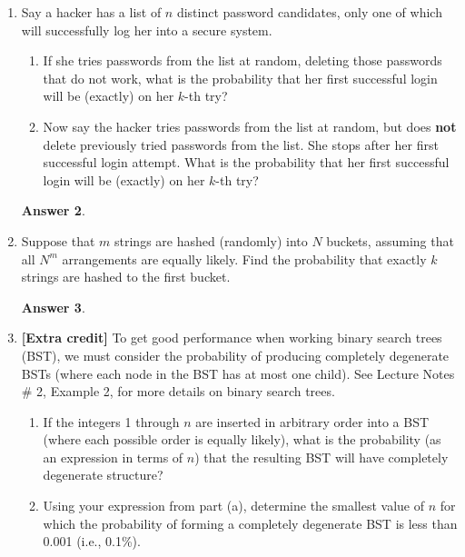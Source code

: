 \documentclass[12pt]{article}
\renewcommand{\(}{\left(}
\renewcommand{\)}{\right)}
\theoremstyle{definition}
\newtheorem*{answer}{Answer}
\begin{document}
\begin{enumerate}
\begin{shaded}
\begin{answer}
    \end{answer}
    \end{shaded}
    \newpage


\item Say a hacker has a list of $n$ distinct password candidates, only one of which will successfully log her into a secure system.
    \begin{enumerate}[label=\alph*.]

    \item If she tries passwords from the list at random, deleting those passwords that do not work, what is the probability that her first successful login will be (exactly) on her $k$-th try?
    \item Now say the hacker tries passwords from the list at random, but does \textbf{not} delete previously tried passwords from the list. She stops after her first successful login attempt.  What is the probability that her first successful login will be (exactly) on her $k$-th try?

    \end{enumerate}

    \begin{shaded}
    \begin{answer}

    \end{answer}
    \end{shaded}
    \newpage


\item Suppose that $m$ strings are hashed (randomly) into $N$ buckets, assuming that all $N^m$ arrangements are equally likely.  Find the probability that exactly $k$ strings are hashed to the first bucket.

    \begin{shaded}
    \begin{answer}

    \end{answer}
    \end{shaded}
    \newpage


\item \textbf{[Extra credit]} To get good performance when working binary search trees (BST), we must consider the probability of producing completely degenerate BSTs (where each node in the BST has at most one child). See Lecture Notes \# 2, Example 2, for more details on binary search trees.
    \begin{enumerate}[label=\alph*.]

    \item If the integers 1 through $n$ are inserted in arbitrary order into a BST (where each possible order is equally likely), what is the probability (as an expression in terms of $n$) that the resulting BST will have completely degenerate structure?
    \item Using your expression from part (a), determine the smallest value of $n$ for which the probability of forming a completely degenerate BST is less than 0.001 (i.e., 0.1\%).


\end{enumerate}
\end{enumerate}
\end{document}

